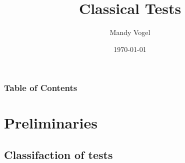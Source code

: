 \documentclass[xcolor={table}]{beamer}
\begin{document}
\title{Classical Tests}   
\author{Mandy Vogel} 
\date{\today}

\begin{frame}
\titlepage
\end{frame}

\begin{frame}
\frametitle{Table of Contents}\tableofcontents
\end{frame}

\section{Preliminaries}
\subsection{Classifaction of tests}
\end{document}
